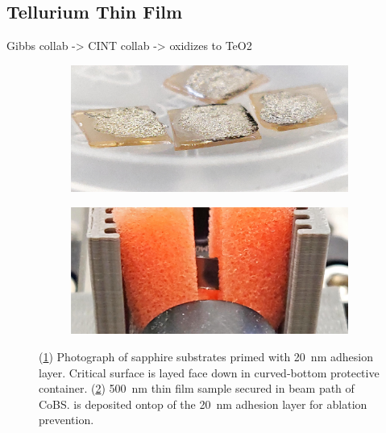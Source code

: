\subsection{Tellurium Thin Film}
\label{subsec:Raman:Target:Te}

Gibbs collab -> CINT collab -> oxidizes to TeO2

\begin{figure}[t]
    \centering
    \begin{subfigure}[b]{0.49\textwidth}
        \centering
        \includegraphics[width=\textwidth]{figs/4-Raman/CINTSamples.png}
        \caption{}
        \label{fig:Raman:CINTSamplesFacedown}
    \end{subfigure}
    \hfill
    \begin{subfigure}[b]{0.49\textwidth}
        \centering
        \includegraphics[width=\textwidth]{figs/4-Raman/TeCINTinFoam.png}
        \caption{}
        \label{fig:Raman:TeCINTinFoam}
    \end{subfigure}
    \caption{(\ref{fig:Raman:CINTSamplesFacedown}) Photograph of sapphire substrates primed with \SI{20}{\nano\meter}  adhesion layer. Critical surface is layed face down in curved-bottom protective container. (\ref{fig:Raman:TeCINTinFoam}) \SI{500}{\nano\meter}  thin film sample secured in beam path of \acl{CoBS}.  is deposited ontop of the \SI{20}{\nano\meter}  adhesion layer for ablation prevention.}
    \label{fig:Raman:CINTSamples}
\end{figure}

